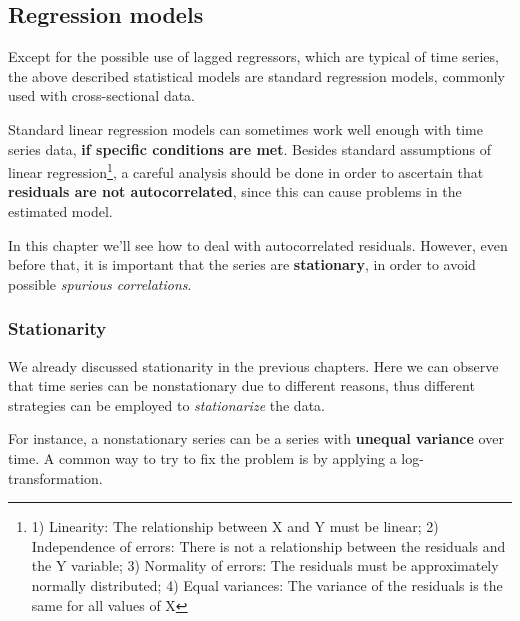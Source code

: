 \documentclass[
]{article}
\begin{document}
\hypertarget{regression-models}{%
\subsection{Regression models}\label{regression-models}}

Except for the possible use of lagged regressors, which are typical of time series, the above described statistical models are standard regression models, commonly used with cross-sectional data.

Standard linear regression models can sometimes work well enough with time series data, \textbf{if specific conditions are met}. Besides standard assumptions of linear regression\footnote{1) Linearity: The relationship between X and Y must be linear; 2) Independence of errors: There is not a relationship between the residuals and the Y variable; 3) Normality of errors: The residuals must be approximately normally distributed; 4) Equal variances: The variance of the residuals is the same for all values of X}, a careful analysis should be done in order to ascertain that \textbf{residuals are not autocorrelated}, since this can cause problems in the estimated model.

In this chapter we'll see how to deal with autocorrelated residuals. However, even before that, it is important that the series are \textbf{stationary}, in order to avoid possible \emph{spurious correlations}.

\hypertarget{stationarity}{%
\subsubsection{Stationarity}\label{stationarity}}

We already discussed stationarity in the previous chapters. Here we can observe that time series can be nonstationary due to different reasons, thus different strategies can be employed to \emph{stationarize} the data.

For instance, a nonstationary series can be a series with \textbf{unequal variance} over time. A common way to try to fix the problem is by applying a log-transformation.
\end{document}
